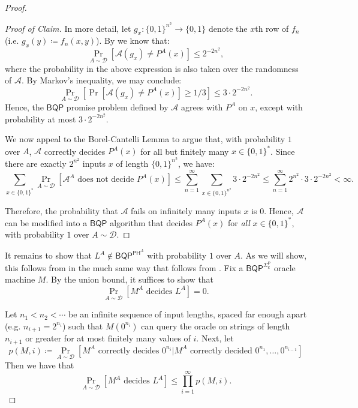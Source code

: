 \documentclass[11pt]{article}%
\begin{document}
\begin{proof}
\begin{proof}[Proof of Claim]
In more detail, let $g_x: \{0,1\}^{n^2} \to \{0,1\}$ denote the $x$th row of $f_n$ (i.e. $g_x(y) \coloneqq f_n(x, y)$). By  we know that:
\[
\Pr_{A \sim \mathcal{D}} \left[\mathcal{A}(g_x) \neq P^A(x)\right] \le 2^{-2n^2},
\]
where the probability in the above expression is also taken over the randomness of $\mathcal{A}$. By Markov's inequality, we may conclude:
\[
\Pr_{A \sim \mathcal{D}} \left[\Pr\left[\mathcal{A}(g_x) \neq P^A(x)\right] \ge 1/3\right] \le 3 \cdot 2^{-2n^2}.
\]
Hence, the $\mathsf{BQP}$ promise problem defined by $\mathcal{A}$ agrees with $P^A$ on $x$, except with probability at most $3 \cdot 2^{-2n^2}$.

We now appeal to the Borel-Cantelli Lemma to argue that, with probability $1$ over $A$, $\mathcal{A}$ correctly decides $P^A(x)$ for all but finitely many $x \in \{0,1\}^*$. Since there are exactly $2^{n^2}$ inputs $x$ of length $\{0,1\}^{n^2}$, we have:
\[
\sum_{x \in \{0,1\}^*} \Pr_{A\sim \mathcal{D}}\left[\mathcal{A}^A \text{ does not decide } P^A(x)\right] \le \sum_{n=1}^{\infty} \sum_{x \in \{0,1\}^{n^2}} 3 \cdot 2^{-2n^2} \le \sum_{n=1}^{\infty} 2^{n^2} \cdot 3 \cdot 2^{-2n^2} < \infty.
\]

Therefore, the probability that $\mathcal{A}$ fails on infinitely many inputs $x$ is $0$. Hence, $\mathcal{A}$ can be modified into a $\mathsf{BQP}$ algorithm that decides $P^A(x)$ for \textit{all} $x \in \{0,1\}^*$, with probability $1$ over $A \sim \mathcal{D}$.
\end{proof}

It remains to show that $L^A \not\in \mathsf{BQP}^{\mathsf{PH}^A}$ with probability $1$ over $A$. As we will show, this follows from  in the much same way that  follows from . Fix a $\mathsf{BQP}^{\mathsf{\Sigma}_k^{\mathsf{P}}}$ oracle machine $M$. By the union bound, it suffices to show that
\[
\Pr_{A \sim \mathcal{D}}\left[M^A \text{ decides } L^A\right]=0.
\]

Let $n_1<n_2<\cdots$ be an infinite sequence of input lengths, spaced far enough apart (e.g. $n_{i+1}=2^{n_i}$) such that $M\left(0^{n_i}\right)$ can query the oracle on strings of length $n_{i+1}$ or greater for at most finitely many values of $i$. Next, let
\[
p(M,i)\coloneqq\Pr_{A \sim \mathcal{D}}\left[M^A \text{ correctly decides } 0^{n_i}|M^A \text{ correctly decided }0^{n_1},\dots,0^{n_{i-1}}\right]
\]
Then we have that
\[
\Pr_{A \sim \mathcal{D}}\left[M^A\text{ decides }L^A\right]\leq\prod_{i=1}^\infty p(M,i).
\]


\end{proof}
\end{document}
